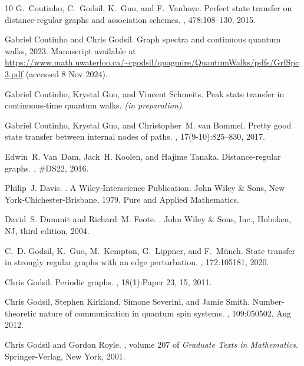 \documentclass{article}
\numberwithin{equation}{section}
\begin{document}
\begin{thebibliography}{10}
G.~Coutinho, C.~Godsil, K.~Guo, and F.~Vanhove.
\newblock Perfect state transfer on distance-regular graphs and association schemes.
, 478:108--130, 2015.

Gabriel Coutinho and Chris Godsil.
\newblock Graph spectra and continuous quantum walks, 2023.
\newblock Manuscript available at \url{https://www.math.uwaterloo.ca/~cgodsil/quagmire/QuantumWalks/pdfs/GrfSpc3.pdf} (accessed 8 Nov 2024).

Gabriel Coutinho, Krystal Guo, and Vincent Schmeits.
\newblock Peak state transfer in continuous-time quantum walks.
\newblock \textit{(in preparation)}.

Gabriel Coutinho, Krystal Guo, and Christopher~M. van Bommel.
\newblock Pretty good state transfer between internal nodes of paths.
, 17(9-10):825--830, 2017.

Edwin~R. Van~Dam, Jack~H. Koolen, and Hajime Tanaka.
\newblock Distance-regular graphs.
, {\#DS22}, 2016.

Philip~J. Davis.
.
\newblock A Wiley-Interscience Publication. John Wiley \& Sons, New York-Chichester-Brisbane, 1979.
\newblock Pure and Applied Mathematics.

David~S. Dummit and Richard~M. Foote.
.
\newblock John Wiley \& Sons, Inc., Hoboken, NJ, third edition, 2004.

C.~D. Godsil, K.~Guo, M.~Kempton, G.~Lippner, and F.~M{\"{u}}nch.
\newblock State transfer in strongly regular graphs with an edge perturbation.
, 172:105181, 2020.

Chris Godsil.
\newblock Periodic graphs.
, 18(1):Paper 23, 15, 2011.

Chris Godsil, Stephen Kirkland, Simone Severini, and Jamie Smith.
\newblock Number-theoretic nature of communication in quantum spin systems.
, 109:050502, Aug 2012.

Chris Godsil and Gordon Royle.
, volume 207 of {\em Graduate Texts in Mathematics}.
\newblock Springer-Verlag, New York, 2001.


\end{thebibliography}
\end{document}
